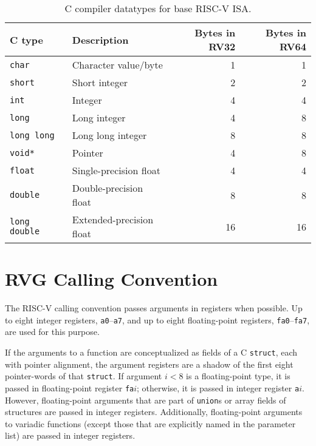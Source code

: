 \vspace{0.2in}
\begin{table*}[htbp]
\begin{center}
\begin{tabular}{|l|l|r|r|}

  \hline
  C type        & Description            & Bytes in RV32 & Bytes in RV64 \\ \hline 
  \tt char      & Character value/byte   & 1             & 1 \\
  \tt short     & Short integer          & 2             & 2 \\
  \tt int       & Integer                & 4             & 4 \\
  \tt long      & Long integer           & 4             & 8 \\
  \tt long long & Long long integer      & 8             & 8 \\
  \tt void*     & Pointer                & 4             & 8 \\
  \tt float     & Single-precision float & 4             & 4 \\
  \tt double    & Double-precision float & 8             & 8 \\
  \tt long double & Extended-precision float & 16        & 16 \\
  \hline

 \end{tabular}
\end{center}
\caption{C compiler datatypes for base RISC-V ISA.}
\label{datatypes}
\end{table*}


\section{RVG Calling Convention}

The RISC-V calling convention passes arguments in registers when
possible.  Up to eight integer registers, {\tt a0}--{\tt a7},
and up to eight floating-point registers, {\tt fa0}--{\tt fa7},
are used for this purpose.

If the arguments to a function are conceptualized as fields of a C
{\tt struct}, each with pointer alignment, the argument registers are
a shadow of the first eight pointer-words of that {\tt struct}.  If
argument $i<8$ is a floating-point type, it is passed in
floating-point register {\tt fa}$i$; otherwise, it is passed in
integer register {\tt a}$i$.  However, floating-point arguments
that are part of {\tt union}s or array fields of structures are passed
in integer registers.  Additionally, floating-point arguments to
variadic functions (except those that are explicitly named in the
parameter list) are passed in integer registers.

